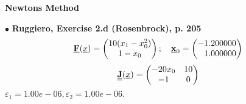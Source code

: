 \documentclass{report}[10pts]
\begin{document}
   \begin{center}
   \textbf{\Large{Newtons Method}}
   \end{center}
$\bullet$
\textbf{Ruggiero, Exercise 2.d (Rosenbrock), p. 205}
\[
   \Vector{F}(\underline{x})=
      \begin{pmatrix*}
      10(x_1-x_0^2) \\ 1-x_0
      \end{pmatrix*}
   ;\quad
   \Vector{x}_0=
      \begin{pmatrix*}[r]
      -1.200000 \\ 1.000000
      \end{pmatrix*}
\]
\[
   \Matrix{J}(\underline{x})=
      \begin{pmatrix*}
         -20x_0 & 10\\
         -1 & 0\\
      \end{pmatrix*}
\]
$
\varepsilon_1=1.00e-06,
\varepsilon_2=1.00e-06.
$
\end{document}
